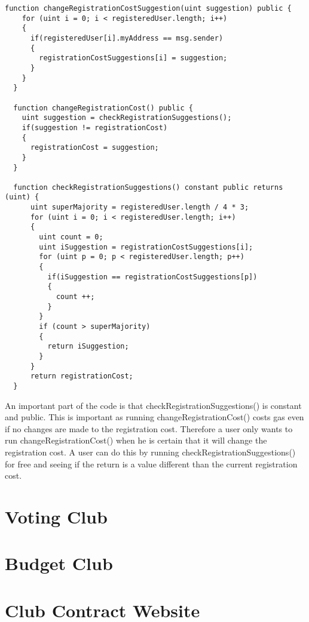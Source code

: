 \begin{lstlisting}
function changeRegistrationCostSuggestion(uint suggestion) public {
    for (uint i = 0; i < registeredUser.length; i++)
    {
      if(registeredUser[i].myAddress == msg.sender)
      {
        registrationCostSuggestions[i] = suggestion;
      }
    }
  }

  function changeRegistrationCost() public {
    uint suggestion = checkRegistrationSuggestions();
    if(suggestion != registrationCost)
    {
      registrationCost = suggestion;
    }
  }

  function checkRegistrationSuggestions() constant public returns (uint) {
      uint superMajority = registeredUser.length / 4 * 3;
      for (uint i = 0; i < registeredUser.length; i++)
      {
        uint count = 0;
        uint iSuggestion = registrationCostSuggestions[i];
        for (uint p = 0; p < registeredUser.length; p++)
        {
          if(iSuggestion == registrationCostSuggestions[p])
          {
            count ++;
          }
        }
        if (count > superMajority)
        {
          return iSuggestion;
        }
      }
      return registrationCost;
  }
\end{lstlisting}
An important part of the code is that checkRegistrationSuggestions() is constant and public. This is important as running changeRegistrationCost() costs gas even if no changes are made to the registration cost. Therefore a user only wants to run changeRegistrationCost() when he is certain that it will change the registration cost. A user can do this by running checkRegistrationSuggestions() for free and seeing if the return is a value different than the current registration cost.
\section{Voting Club}

\section{Budget Club}
\section{Club Contract Website}